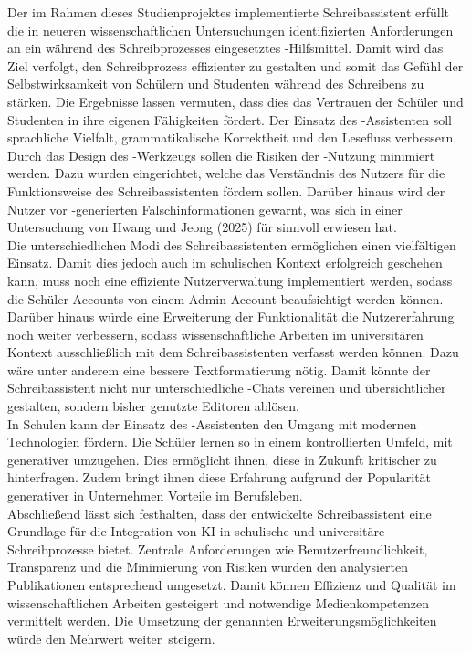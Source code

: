 \documentclass[../main.tex]{subfiles}
\begin{document}
Der im Rahmen dieses Studienprojektes implementierte Schreibassistent erfüllt die in neueren wissenschaftlichen Untersuchungen identifizierten Anforderungen an ein während des Schreibprozesses eingesetztes 
-Hilfsmittel. Damit wird das Ziel verfolgt, den Schreibprozess effizienter zu gestalten und somit das Gefühl der Selbstwirksamkeit von Schülern und Studenten während des 
Schreibens zu stärken. Die Ergebnisse lassen vermuten, dass dies das Vertrauen der Schüler und Studenten in ihre eigenen Fähigkeiten fördert. Der Einsatz des -Assistenten soll sprachliche Vielfalt, grammatikalische Korrektheit und den Lesefluss verbessern. \\
Durch das Design des -Werkzeugs sollen die Risiken der -Nutzung minimiert werden. Dazu wurden  eingerichtet, welche das Verständnis des Nutzers für die Funktionsweise des 
Schreibassistenten fördern sollen. Darüber hinaus wird der Nutzer vor -generierten Falschinformationen gewarnt, was sich in einer Untersuchung von Hwang und Jeong (2025) für sinnvoll 
erwiesen hat. \\
Die unterschiedlichen Modi des Schreibassistenten ermöglichen einen vielfältigen Einsatz. Damit dies jedoch auch im schulischen Kontext erfolgreich geschehen kann, muss noch eine 
effiziente Nutzerverwaltung implementiert werden, sodass die Schüler-Accounts von einem Admin-Account beaufsichtigt werden können.\\
Darüber hinaus würde eine Erweiterung der Funktionalität die Nutzererfahrung noch weiter verbessern, sodass wissenschaftliche Arbeiten im universitären Kontext ausschließlich 
mit dem Schreibassistenten verfasst werden können. Dazu wäre unter anderem eine bessere Textformatierung nötig. Damit könnte der Schreibassistent nicht nur unterschiedliche -Chats vereinen und übersichtlicher gestalten, sondern bisher genutzte 
Editoren ablösen.\\
In Schulen kann der Einsatz des -Assistenten den Umgang mit modernen Technologien fördern. Die Schüler lernen so in einem kontrollierten Umfeld, mit generativer  umzugehen. 
Dies ermöglicht ihnen, diese in Zukunft kritischer zu hinterfragen. Zudem bringt ihnen diese Erfahrung aufgrund der Popularität generativer  in Unternehmen Vorteile im Berufsleben.\\
Abschließend lässt sich festhalten, dass der entwickelte Schreibassistent eine Grundlage für die Integration von KI in schulische und universitäre Schreibprozesse bietet. 
Zentrale Anforderungen wie Benutzerfreundlichkeit, Transparenz und die Minimierung von Risiken wurden den analysierten Publikationen entsprechend umgesetzt. 
Damit können Effizienz und Qualität im wissenschaftlichen Arbeiten gesteigert und notwendige Medienkompetenzen vermittelt werden. Die Umsetzung der genannten Erweiterungsmöglichkeiten würde 
den Mehrwert \mbox{weiter steigern.} 
\end{document}
